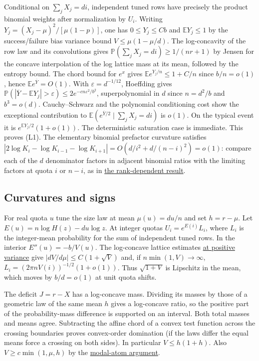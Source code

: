 Conditional on $\sum_j X_j=di$, independent tuned rows have precisely the product binomial weights after normalization by $U_i$. Writing $Y_j=(X_j-\mu)^2/[\mu(1-p)]$, one has $0\le Y_j\le Cb$ and $\mathbb EY_j\le1$ by the success/failure bias variance bound $V\le\mu(1-\mu/d)$. The log-concavity of the row law and its convolutions gives $\mathbb P(\sum_jX_j=di)\ge1/(nr+1)$ by Jensen for the concave interpolation of the log lattice mass at its mean, followed by the entropy bound. The chord bound for $e^x$ gives $\mathbb E e^{Y_j/n}\le1+C/n$ since $b/n=o(1)$, hence $\mathbb E e^{\overline Y}=O(1)$. With $\varepsilon=d^{-1/12}$, Hoeffding gives $\mathbb P(|\overline Y-\mathbb E Y_j|>\varepsilon)\le2e^{-c n\varepsilon^2/b^2}$, superpolynomial in $d$ since $n=d^2/b$ and $b^3=o(d)$. Cauchy--Schwarz and the polynomial conditioning cost show the exceptional contribution to $\mathbb E(e^{\overline Y/2}\mid\sum_jX_j=di)$ is $o(1)$. On the typical event it is $e^{\mathbb E Y_j/2}(1+o(1))$. The deterministic saturation case is immediate. This proves (L1). The elementary binomial prefactor curvature satisfies $|2\log K_i-\log K_{i-1}-\log K_{i+1}|=O(d/i^2+d/(n-i)^2)=o(1)$: compare each of the $d$ denominator factors in adjacent binomial ratios with the limiting factors at quota $i$ or $n-i$, as in \href{https://github.com/ProgramComputer/open-math-research/tree/ba7ddfd7efb37cac33769f4fdfed749e1b5bf58a/topics/balanced-arrays/dense-regime/rank-dependent}{the rank-dependent result}.

\subsection{Curvatures and signs}

For real quota $u$ tune the size law at mean $\mu(u)=du/n$ and set $h=r-\mu$. Let $E(u)=n\log H(z)-du\log z$. At integer quotas $U_i=e^{E(i)}L_i$, where $L_i$ is the integer-mean probability for the sum of independent tuned rows. In the interior $E''(u)=-b/V(u)$. The log-concave lattice estimates \hyperref[sec:subquadratic-scaling-corank-upper]{at positive variance} give $\left|dV/d\mu\right|\le C(1+\sqrt V)$ and, if $n\min(1,V)\to\infty$, $L_i=(2\pi nV(i))^{-1/2}(1+o(1))$. Thus $\sqrt{1+V}$ is Lipschitz in the mean, which moves by $b/d=o(1)$ at unit quota shifts.

The deficit $J=r-X$ has a log-concave mass. Dividing its masses by those of a geometric law of the same mean $h$ gives a log-concave ratio, so the positive part of the probability-mass difference is supported on an interval. Both total masses and means agree. Subtracting the affine chord of a convex test function across the crossing boundaries proves convex-order domination (if the laws differ the equal means force a crossing on both sides). In particular $V\le h(1+h)$. Also $V\ge c\min(1,\mu,h)$ by the \href{https://github.com/ProgramComputer/open-math-research/blob/4fb624ba937a8eecc1361a6066185cd81ab7b172/topics/balanced-arrays/quadratic/very-tall-quadratic-interior-saddle.md}{modal-atom argument}.

